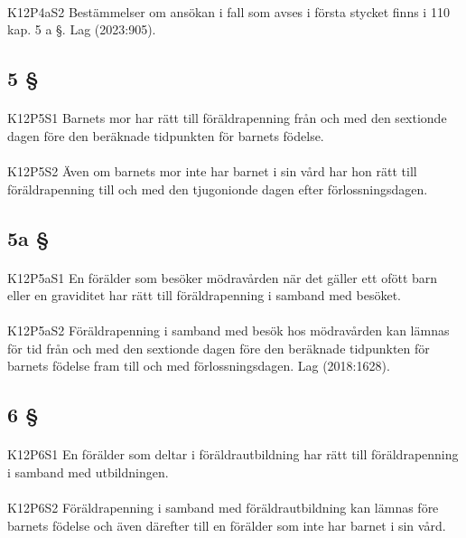 \documentclass[a4paper,notitlepage,openany,10pt]{book}
\begin{document}
\paragraph*{}
{\tiny K12P4aS2}
Bestämmelser om ansökan i fall som avses i första stycket finns i 110 kap. 5 a §.
Lag (2023:905).
\subsection*{5 §}
\paragraph*{}
{\tiny K12P5S1}
Barnets mor har rätt till föräldrapenning från och med den sextionde dagen före den beräknade tidpunkten för barnets födelse.
\paragraph*{}
{\tiny K12P5S2}
Även om barnets mor inte har barnet i sin vård har hon rätt till föräldrapenning till och med den tjugonionde dagen efter förlossningsdagen.
\subsection*{5a §}
\paragraph*{}
{\tiny K12P5aS1}
En förälder som besöker mödravården när det gäller ett ofött barn eller en graviditet har rätt till föräldrapenning i samband med besöket.
\paragraph*{}
{\tiny K12P5aS2}
Föräldrapenning i samband med besök hos mödravården kan lämnas för tid från och med den sextionde dagen före den beräknade tidpunkten för barnets födelse fram till och med förlossningsdagen.
Lag (2018:1628).
\subsection*{6 §}
\paragraph*{}
{\tiny K12P6S1}
En förälder som deltar i föräldrautbildning har rätt till föräldrapenning i samband med utbildningen.
\paragraph*{}
{\tiny K12P6S2}
Föräldrapenning i samband med föräldrautbildning kan lämnas före barnets födelse och även därefter till en förälder som inte har barnet i sin vård.
\end{document}
